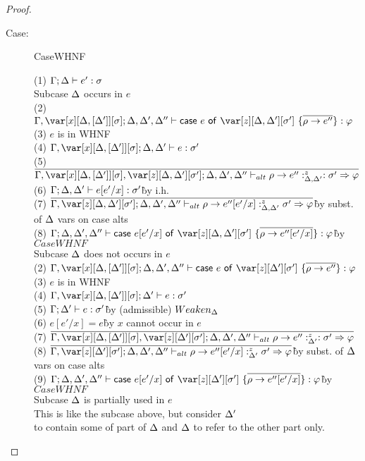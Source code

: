 \begin{proof}
\begin{description}
\item[Case:] CaseWHNF
\begin{tabbing}
    (1) $\Gamma; \Delta \vdash e' : \sigma$\\
    Subcase $\Delta$ occurs in $e$\\
    (2) $\G,\xD;\D,\D',\D'' \vdash \ccase{e}{\z[\D,\D'][\s']~\{\ov{\rho \to e''}\}} : \vp$\\
    (3) $e$ is in WHNF\\
    (4) $\G,\xD;\D,\D' \vdash e : \s'$\\
    (5) $\ov{\G,\xD,\z[\D,\D'][\s']; \D,\D',\D'' \vdash_{alt} \rho \to e'' :^z_{\D,\D'} : \s' \Rightarrow \vp}$\\
    (6) $\Gamma;\Delta,\Delta' \vdash e[e'/x] : \sigma'$\` by i.h.\\
    (7) $\ov{\G,\z[\D,\D'][\s']; \D,\D',\D'' \vdash_{alt} \rho \to e''[e'/x] :^z_{\D,\D'} \s' \Rightarrow \vp}$\` by subst. of $\Delta$ vars on case alts\\
    (8) $\G;\D,\D',\D'' \vdash \ccase{e[e'/x]}{\z[\D,\D'][\s']~\{\ov{\rho \to e''[e'/x]}\}} : \vp$\` by $CaseWHNF$\\
    Subcase $\Delta$ does not occurs in $e$\\
    (2) $\G,\xD;\D,\D',\D'' \vdash \ccase{e}{\z[\D'][\s']~\{\ov{\rho \to e''}\}} : \vp$\\
    (3) $e$ is in WHNF\\
    (4) $\G,\xD;\D' \vdash e : \s'$\\
    (5) $\Gamma;\Delta' \vdash e : \sigma'$\` by (admissible) $Weaken_\Delta$\\
    (6) $e[e'/x] = e$\` by $x$ cannot occur in $e$\\
    (7) $\ov{\G,\xD,\z[\D'][\s']; \D,\D',\D'' \vdash_{alt} \rho \to e'' :^z_{\D'} : \s' \Rightarrow \vp}$\\
    (8) $\ov{\G,\z[\D'][\s']; \D,\D',\D'' \vdash_{alt} \rho \to e''[e'/x] :^z_{\D'} \s' \Rightarrow \vp}$\` by subst. of $\Delta$ vars on case alts\\
    (9) $\G;\D,\D',\D'' \vdash \ccase{e[e'/x]}{\z[\D'][\s']~\{\ov{\rho \to e''[e'/x]}\}} : \vp$\` by $CaseWHNF$\\
    Subcase $\Delta$ is partially used in $e$\\
    This is like the subcase above, but consider $\Delta'$\\
    to contain some of part of $\Delta$ and $\Delta$ to refer to the other part only.
\end{tabbing}


\end{description}
\end{proof}
